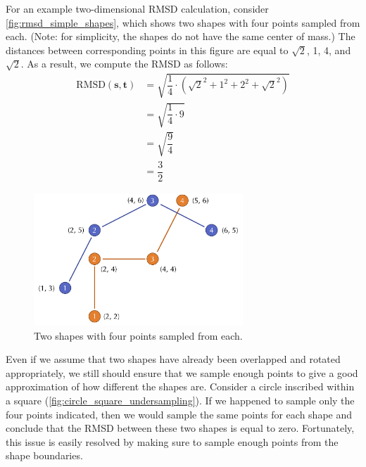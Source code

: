 \begin{note}\end{note}

For an example two-dimensional RMSD calculation, consider \autoref{fig:rmsd_simple_shapes}, which shows two shapes with four points sampled from each. (Note: for simplicity, the shapes do not have the same center of mass.) The distances between corresponding points in this figure are equal to $\sqrt{2}$, 1, 4, and $\sqrt{2}$. As a result, we compute the RMSD as follows:
\begin{align*}
	\text{RMSD}(\mathbf{s}, \mathbf{t}) &= \sqrt{\dfrac{1}{4} \cdot (\sqrt{2}^2 + 1^2 + 2^2 + \sqrt{2}^2)} \\
	&= \sqrt{\dfrac{1}{4} \cdot 9}\\
	&= \sqrt{\dfrac{9}{4}}\\
	&= \dfrac{3}{2}
\end{align*}

\begin{figure}[h]
	\centering
	\mySfFamily
	\includegraphics[width = 0.7\textwidth]{../images/rmsd_simple_shapes.png}
	\caption{Two shapes with four points sampled from each.}
	\label{fig:rmsd_simple_shapes}
\end{figure}

\begin{qbox}\end{qbox}

Even if we assume that two shapes have already been overlapped and rotated appropriately, we still should ensure that we sample enough points to give a good approximation of how different the shapes are. Consider a circle inscribed within a square (\autoref{fig:circle_square_undersampling}). If we happened to sample only the four points indicated, then we would sample the same points for each shape and conclude that the RMSD between these two shapes is equal to zero. Fortunately, this issue is easily resolved by making sure to sample enough points from the shape boundaries.\\

